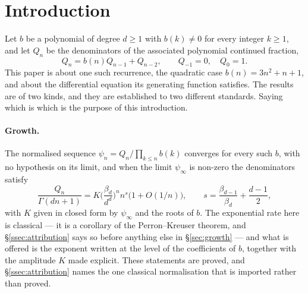 %

\section{Introduction}\label{sec:intro}

Let $b$ be a polynomial of degree $d\ge1$ with $b(k)\neq0$ for every integer
$k\ge1$, and let $Q_n$ be the denominators of the associated polynomial
continued fraction,
\[
  Q_n=b(n)Q_{n-1}+Q_{n-2},\qquad Q_{-1}=0,\quad Q_0=1 .
\]
This paper is about one such recurrence, the quadratic case
$b(n)=3n^{2}+n+1$, and about the differential equation its generating function
satisfies. The results are of two kinds, and they are established to two
different standards. Saying which is which is the purpose of this introduction.

\paragraph{Growth.} The normalised sequence $\psi_n=Q_n/\prod_{k\le n}b(k)$
converges for every such $b$, with no hypothesis on its limit, and when the
limit $\psi_\infty$ is non-zero the denominators satisfy
\[
  \frac{Q_n}{\Gamma(dn+1)}
  =K\Big(\frac{\beta_d}{d^{d}}\Big)^{n}n^{s}\bigl(1+O(1/n)\bigr),
  \qquad s=\frac{\beta_{d-1}}{\beta_d}+\frac{d-1}{2},
\]
with $K$ given in closed form by $\psi_\infty$ and the roots of $b$. The
exponential rate here is classical --- it is a corollary of the Perron--Kreuser
theorem, and \S\ref{ssec:attribution} says so before anything else in
\S\ref{sec:growth} --- and what is offered is the exponent written at the level
of the coefficients of $b$, together with the amplitude $K$ made explicit. These
statements are proved, and \S\ref{ssec:attribution} names the one classical
normalisation that is imported rather than proved.

